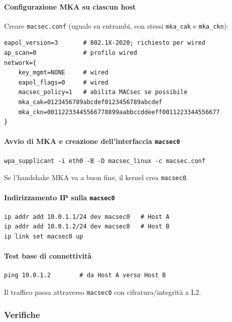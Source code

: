 \paragraph{Configurazione MKA su ciascun host}
Creare \texttt{macsec.conf} (uguale su entrambi, con stessi \texttt{mka\_cak} e \texttt{mka\_ckn}):
\begin{verbatim}
eapol_version=3       # 802.1X-2020; richiesto per wired
ap_scan=0             # profilo wired
network={
    key_mgmt=NONE     # wired
    eapol_flags=0     # wired
    macsec_policy=1   # abilita MACsec se possibile
    mka_cak=0123456789abcdef0123456789abcdef
    mka_ckn=00112233445566778899aabbccddeeff0011223344556677
}
\end{verbatim}

\paragraph{Avvio di MKA e creazione dell'interfaccia \texttt{macsec0}}
\begin{verbatim}
wpa_supplicant -i eth0 -B -D macsec_linux -c macsec.conf
\end{verbatim}
Se l'handshake MKA va a buon fine, il kernel crea \texttt{macsec0}. %

\paragraph{Indirizzamento IP sulla \texttt{macsec0}}
\begin{verbatim}
ip addr add 10.0.1.1/24 dev macsec0   # Host A
ip addr add 10.0.1.2/24 dev macsec0   # Host B
ip link set macsec0 up
\end{verbatim}

\paragraph{Test base di connettività}
\begin{verbatim}
ping 10.0.1.2        # da Host A verso Host B
\end{verbatim}
Il traffico passa attraverso \texttt{macsec0} con cifratura/integrità a L2. %

\subsubsection{Verifiche}
